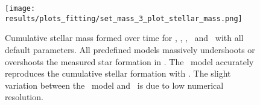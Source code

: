 \begin{figure}[h]
  \centering
  \texttt{[image: results/plots\_fitting/set\_mass\_3\_plot\_stellar\_mass.png]}
  \caption[]{\label{fig:fit-v1-3-stellar}
    Cumulative stellar mass formed over time for \eris, \mwomega, \mwcomega, \fiduccialomega\ and \omegamodel\ with all default parameters.
    All predefined models massively undershoots or overshoots the measured star formation in \eris.
    The \fiduccialomega\ model accurately reproduces the cumulative stellar formation with \eris. The slight variation between the \fiduccialomega\ model and \eris\ is due to low numerical resolution.
  }
\end{figure}
\FloatBarrier

